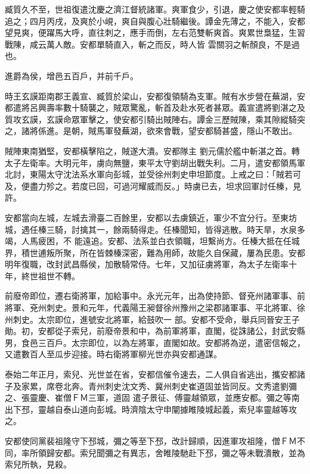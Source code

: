 \begin{pinyinscope}
 臧質久不至，世祖復遣沈慶之濟江督統諸軍。爽軍食少，引退，慶之使安都率輕騎追之；四月丙戌，及爽於小峴，爽自與腹心壯騎繼後。譚金先薄之，不能入，安都望見爽，便躍馬大呼，直往刺之，應手而倒，左右范雙斬爽首。爽累世梟猛，生習戰陳，咸云萬人敵。安都單騎直入，斬之而反，時人皆
 雲關羽之斬顏良，不是過也。



 進爵為侯，增邑五百戶，并前千戶。



 時王玄謨距南郡王義宣、臧質於梁山，安都復領騎為支軍。賊有水步營在蕪湖，安都遣將呂興壽率數十騎襲之，賊眾驚亂，斬首及赴水死者甚眾。義宣遣將劉湛之及質攻玄謨，玄謨命眾軍擊之，使安都引騎出賊陣右。譚金三歷賊陳，乘其隙縱騎突之，諸將係進。是朝，賊馬軍發蕪湖，欲來會戰，望安都騎甚盛，隱山不敢出。



 賊陣東南猶堅，安都橫擊陷之，賊遂大潰。安都隊主
 劉元儒於艦中斬湛之首。轉太子左衛率。大明元年，虜向無鹽，東平太守劉胡出戰失利。二月，遣安都領馬軍北討，東陽太守沈法系水軍向彭城，並受徐州刺史申坦節度。上戒之曰：「賊若可及，便盡力殄之。若度已回，可過河耀威而反。」時虜已去，坦求回軍討任榛，見許。



 安都當向左城，左城去滑臺二百餘里，安都以去虜鎮近，軍少不宜分行。至東坊城，遇任榛三騎，討擒其一，餘兩騎得走。任榛聞知，皆得逃散。時天旱，水泉多竭，人馬疲困，不
 能遠追。安都、法系並白衣領職，坦繫尚方。任榛大抵在任城界，積世逋叛所聚，所在皆棘榛深密，難為用師，故能久自保藏，屢為民患。安都明年復職，改封武昌縣侯，加散騎常侍。七年，又加征虜將軍，為太子左衛率十年，終世祖世不轉。



 前廢帝即位，遷右衛將軍，加給事中。永光元年，出為使持節、督兗州諸軍事、前將軍、兗州刺史。景和元年，代義陽王昶督徐州豫州之梁郡諸軍事、平北將軍、徐州刺史。太宗即位，進號安北將軍，給鼓吹一
 部。安都不受命，舉兵同晉安王子勛。初，安都從子索兒，前廢帝景和中，為前軍將軍，直閣，從誅諸公，封武安縣男，食邑三百戶。太宗即位，以為左將軍，直閣如故。安都將為逆，遣密信報之，又遣數百人至瓜步迎接。時右衛將軍柳光世亦與安都通謀。



 泰始二年正月，索兒、光世並在省，安都信催令速去，二人俱自省逃出，攜安都諸子及家累，席卷北奔。青州刺史沈文秀、冀州刺史崔道固並皆同反。文秀遣劉彌之、張靈慶、崔僧ＦＭ三軍，道固
 遣子景征、傅靈越領眾，並應安都。彌之等南出下邳，靈越自泰山道向彭城。時濟陰太守申闡據睢陵城起義，索兒率靈越等攻之。



 安都使同黨裴祖隆守下邳城，彌之等至下邳，改計歸順，因進軍攻祖隆，僧ＦＭ不同，率所領歸安都。索兒聞彌之有異志，舍睢陵馳赴下邳，彌之等未戰潰散，並為索兒所執，見殺。




\end{pinyinscope}
